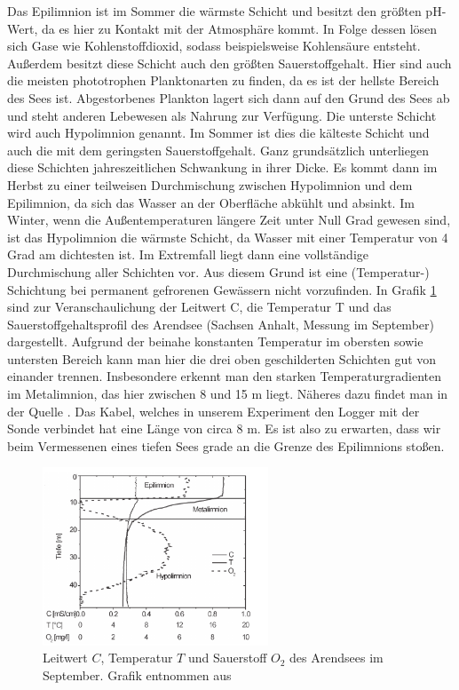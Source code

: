 \documentclass[12pt,a4paper,titlepage,headinclude,bibtotoc]{scrartcl}
\numberwithin{equation}{subsection}
\begin{document}
Das Epilimnion ist im Sommer die wärmste Schicht und besitzt den größten pH-Wert, da es hier zu Kontakt mit der Atmosphäre kommt.
In Folge dessen lösen sich Gase wie Kohlenstoffdioxid, sodass beispielsweise Kohlensäure entsteht.
Außerdem besitzt diese Schicht auch den größten Sauerstoffgehalt.
Hier sind auch die meisten phototrophen Planktonarten zu finden, da es ist der hellste Bereich des Sees ist.
Abgestorbenes Plankton lagert sich dann auf den Grund des Sees ab und steht anderen Lebewesen als Nahrung zur Verfügung.
\newline
Die unterste Schicht wird auch Hypolimnion genannt.
Im Sommer ist dies die kälteste Schicht und auch die mit dem geringsten Sauerstoffgehalt. 
Ganz grundsätzlich unterliegen diese Schichten jahreszeitlichen Schwankung in ihrer Dicke.
Es kommt dann im Herbst zu einer teilweisen Durchmischung zwischen Hypolimnion und dem Epilimnion, da sich das Wasser an der Oberfläche abkühlt und absinkt.
Im Winter, wenn die Außentemperaturen längere Zeit unter Null Grad gewesen sind, ist das Hypolimnion die wärmste Schicht, da Wasser mit einer Temperatur von 4 Grad am dichtesten ist. 
Im Extremfall liegt dann eine vollständige Durchmischung aller Schichten vor.
Aus diesem Grund ist eine (Temperatur-) Schichtung bei permanent gefrorenen Gewässern nicht vorzufinden.
\newline
In Grafik \ref{fig:schichtung} sind zur Veranschaulichung der Leitwert C, die Temperatur T und das Sauerstoffgehaltsprofil des Arendsee (Sachsen Anhalt, Messung im September) dargestellt. 
Aufgrund der beinahe konstanten Temperatur im obersten sowie untersten Bereich kann man hier die drei oben geschilderten Schichten gut von einander trennen.
Insbesondere erkennt man den starken Temperaturgradienten im Metalimnion, das hier zwischen 8 und 15 m liegt. 
Näheres dazu findet man in der Quelle \cite{schicht}.
Das Kabel, welches in unserem Experiment den Logger mit der Sonde verbindet hat eine Länge von circa 8 m.
Es ist also zu erwarten, dass wir beim Vermessenen eines tiefen Sees grade an die Grenze des Epilimnions stoßen.


\begin{figure}[h]
	\centering
	\includegraphics[width=0.6\textwidth]{schicht.png}
	\caption{Leitwert $C$, Temperatur $T$ und Sauerstoff $O_2$ des Arendsees im September. Grafik entnommen aus \cite{schicht} }
	\label{fig:schichtung}
\end{figure}
\end{document}
